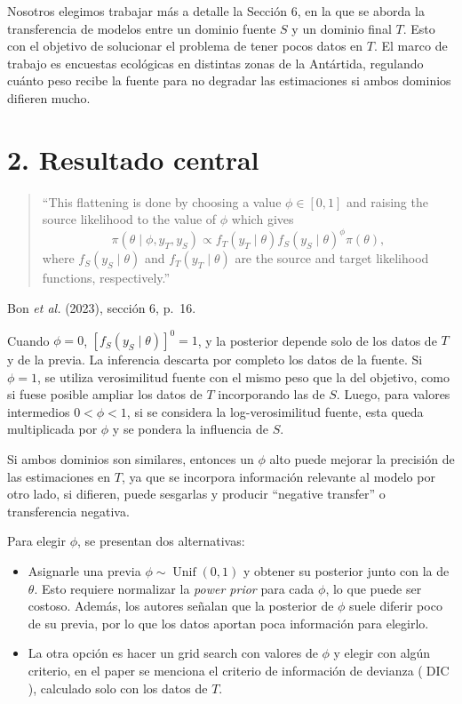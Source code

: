 \documentclass[10pt,a4paper]{article}
\newcommand{\Unif}{\operatorname{Unif}}
\newcommand{\DIC}{\operatorname{DIC}}
\begin{document}
Nosotros elegimos trabajar más a detalle la Sección 6, en la que se aborda la transferencia de modelos entre un dominio fuente $S$ y un dominio final $T$. Esto con el objetivo de solucionar el problema de tener pocos datos en $T$. El marco de trabajo es encuestas ecológicas en distintas zonas de la Antártida, regulando cuánto peso recibe la fuente para no degradar las estimaciones si ambos dominios difieren mucho.

\section{2. Resultado central}\label{sec:resultado}

\begin{quote}
``This flattening is done by choosing a value $\phi\in[0,1]$ and raising the source likelihood to the value of $\phi$ which gives
\[
\pi(\theta\mid\phi,y_T,y_S)\propto f_T(y_T\mid\theta)f_S(y_S\mid\theta)^{\phi}\pi(\theta),
\]
where $f_S(y_S\mid\theta)$ and $f_T(y_T\mid\theta)$ are the source and target likelihood functions, respectively.''
\end{quote}

{\small Bon \emph{et al.} (2023), sección 6, p.~16.}

Cuando $\phi = 0$, $[f_S(y_S\mid\theta)]^0 = 1$, y la posterior depende solo de los datos de $T$ y de la previa. La inferencia descarta por completo los datos de la fuente. Si $\phi = 1$, se utiliza verosimilitud fuente con el mismo peso que la del objetivo, como si fuese posible ampliar los datos de $T$ incorporando las de $S$. Luego, para valores intermedios $0 < \phi < 1$, si se considera la log-verosimilitud fuente, esta queda multiplicada por $\phi$ y se pondera la influencia de $S$.

Si ambos dominios son similares, entonces un $\phi$ alto puede mejorar la precisión de las estimaciones en $T$, ya que se incorpora información relevante al modelo por otro lado, si difieren, puede sesgarlas y producir ``negative transfer'' o transferencia negativa.

\pagebreak
Para elegir $\phi$, se presentan dos alternativas:
\begin{itemize}
\item Asignarle una previa $\phi\sim\Unif(0,1)$ y obtener su posterior junto con la de $\theta$. Esto requiere normalizar la \emph{power prior} para cada $\phi$, lo que puede ser costoso. Además, los autores señalan que la posterior de $\phi$ suele diferir poco de su previa, por lo que los datos aportan poca información para elegirlo.
\item La otra opción es hacer un grid search con valores de $\phi$ y elegir con algún criterio, en el paper se menciona el criterio de información de devianza ($\DIC$), calculado solo con los datos de $T$.
\end{itemize}
\end{document}
